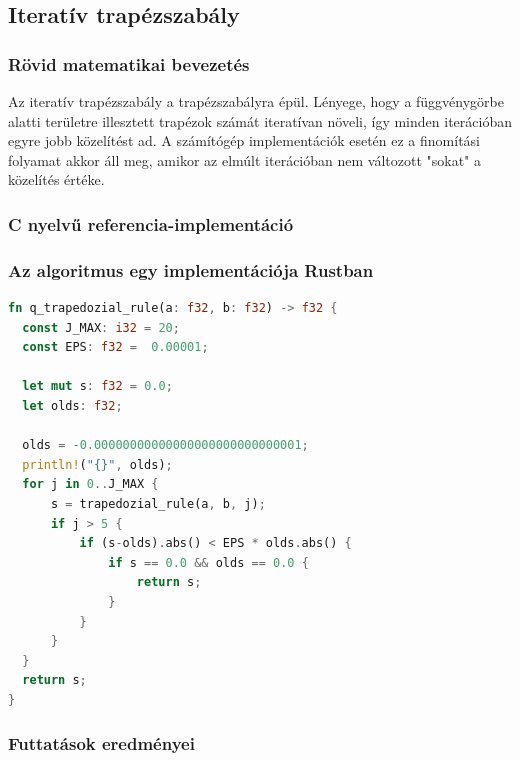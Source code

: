 \subsection{Iteratív trapézszabály}
\subsubsection{Rövid matematikai bevezetés}
Az iteratív trapézszabály a trapézszabályra épül. Lényege, hogy a függvénygörbe alatti területre illesztett trapézok számát iteratívan növeli, így minden iterációban egyre jobb közelítést ad. A számítógép implementációk esetén ez a finomítási folyamat akkor áll meg, amikor az elmúlt iterációban nem változott "sokat" a közelítés értéke.
\subsubsection{C nyelvű referencia-implementáció}
\subsubsection{Az algoritmus egy implementációja Rustban}
\begin{lstlisting}[language=Rust]
fn q_trapedozial_rule(a: f32, b: f32) -> f32 {
  const J_MAX: i32 = 20;
  const EPS: f32 =  0.00001;
  
  let mut s: f32 = 0.0;
  let olds: f32;
  
  olds = -0.00000000000000000000000000001;
  println!("{}", olds);
  for j in 0..J_MAX {
	  s = trapedozial_rule(a, b, j);
	  if j > 5 {
		  if (s-olds).abs() < EPS * olds.abs() {
			  if s == 0.0 && olds == 0.0 {
				  return s;
			  }
		  }
	  }
  }
  return s;
}
\end{lstlisting}

\subsubsection{Futtatások eredményei}

